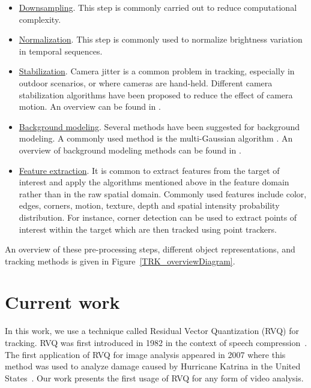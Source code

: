 \begin{itemize}
\item \underline{Downsampling}.  This step is commonly carried out to reduce computational complexity.
\item \underline{Normalization}.  This step is commonly used to normalize brightness variation in temporal sequences.
\item \underline{Stabilization}.  Camera jitter is a common problem in tracking, especially in outdoor scenarios, or where cameras are hand-held.  Different camera stabilization algorithms have been proposed to reduce the effect of camera motion.  An overview can be found in \cite{2006_WHITE_stab_Sachs, 1999_JNL_stab_Engelsberg}.
\item \underline{Background modeling}.  Several methods have been suggested for background modeling.  A commonly used method is the multi-Gaussian algorithm \cite{1999_CNF_RealTimeTracking_Stauffer}.  An overview of background modeling methods can be found in \cite{1999_CNF_Wallflower_Toyama}.
\item \underline{Feature extraction}.  It is common to extract features from the target of interest and apply the algorithms mentioned above in the feature domain rather than in the raw spatial domain.  Commonly used features include color, edges, corners, motion, texture, depth and spatial intensity probability distribution.  For instance, corner detection \cite{1988_CNF_CombinedCornerEdgeDetector_Harris,2004_JNL_SIFT_Mikolajczyk} can be used to extract points of interest within the target which are then tracked using point trackers. 
\end{itemize}

An overview of these pre-processing steps, different object representations, and tracking methods is given in Figure~\ref{TRK_overviewDiagram}.

\section{Current work}
In this work, we use a technique called Residual Vector Quantization (RVQ) for tracking.  RVQ was first introduced in 1982 in the context of speech compression~\cite{1982_CNF_SpeechRVQ_JuangGray}.  The first application of RVQ for image analysis appeared in 2007 where this method was used to analyze damage caused by Hurricane Katrina in the United States~\cite{2007_JNL_Katrina_Barnes}.  Our work presents the first usage of RVQ for any form of video analysis. 

